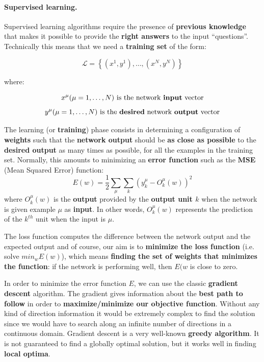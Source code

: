 
\paragraph*{Supervised learning.} Supervised learning algorithms require the presence of \textbf{previous knowledge} that makes it possible to provide the \textbf{right answers} to the input ``questions''. Technically this means that we need a \textbf{training set} of the form:

$$
\mathcal{L} =\left\{\left(x^1, y^1 \right), \dots , \left(x^N, y ^N \right) \right\}
$$

where:

$$x^\mu (\mu=1,\dots, N) \text{ is the network \textbf{input} vector}$$
$$y^\mu (\mu=1,\dots, N) \text{ is the \textbf{desired} network \textbf{output} vector}$$

The learning (or \textbf{training}) phase consists in determining a configuration of \textbf{weights} such that the \textbf{network output} should be \textbf{as close as possible} to the \textbf{desired output} as many times as possible, for all the examples in the training set. Normally, this amounts to minimizing an \textbf{error function} such as the \textbf{MSE} (Mean Squared Error) function:
$$E(w) = \frac{1}{2} \sum_{\mu} \sum_{k} \left(y_k^\mu - O_k^\mu(w)\right)^2$$
where $O_k^\mu(w)$ is the \textbf{output} provided by the \textbf{output unit $k$} when the network is given example $\mu$ as \textbf{input}. In other words, $O_k^\mu(w)$ represents the prediction of the $k^{th}$ unit when the input is $\mu$. 

The loss function computes the difference between the network output and the expected output and of course, our aim is to \textbf{minimize the loss function} (i.e. solve $min_w E(w)$), which means \textbf{finding the set of weights that minimizes the function}: if the network is performing well, then $E(w$ is close to zero.

In order to minimize the error function $E$, we can use the classic \textbf{gradient descent} algorithm. The gradient gives information about the \textbf{best path to follow} in order to \textbf{maximize/minimize our objective function}. Without any kind of direction information it would be extremely complex to find the solution since we would have to search along an infinite number of directions in a continuous domain. Gradient descent is a very well-known \textbf{greedy algorithm}. It is not guaranteed to find a globally optimal solution, but it works well in finding \textbf{local optima}. 

